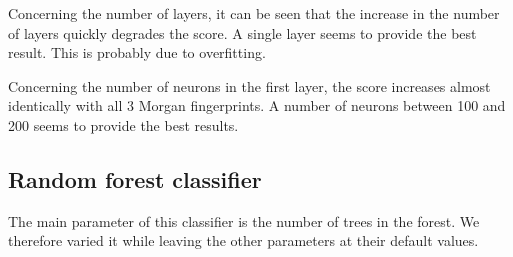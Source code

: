 Concerning the number of layers, it can be seen that the increase in the number of layers quickly degrades the score. A single layer seems to provide the best result. This is probably due to overfitting.

Concerning the number of neurons in the first layer, the score increases almost identically with all 3 Morgan fingerprints. A number of neurons between 100 and 200 seems to provide the best results.

\subsection{Random forest classifier}

The main parameter of this classifier is the number of trees in the forest. We therefore varied it while leaving the other parameters at their default values.

